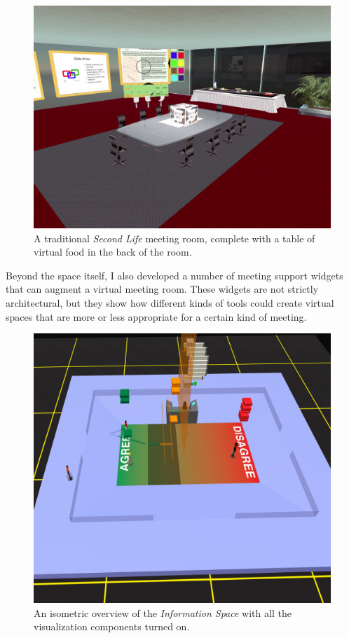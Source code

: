 \begin{figure}[t]
	\includegraphics{figures/secondlife-meeting-room.png}
	\caption{A traditional \emph{Second Life} meeting room, complete with a table of virtual food in the back of the room.}
	\label{fig:secondlife-meeting-room}
\end{figure}


Beyond the space itself, I also developed a number of meeting support widgets that can augment a virtual meeting room. These widgets are not strictly architectural, but they show how different kinds of tools could create virtual spaces that are more or less appropriate for a certain kind of meeting.

\begin{figure}[t]
	\includegraphics{figures/information-space-iso-overview.png}
	\caption{An isometric overview of the \emph{Information Space} with all the visualization components turned on.}
	\label{fig:information_space_overview}
\end{figure}

